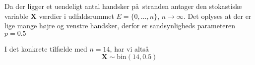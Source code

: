 {
Da der ligger et uendeligt antal handsker p\aa\ stranden antager den stokastiske variable $\mathbf{X}$ v\ae rdier i udfaldsrummet $E = \{0,\dots,n\}$, $n \rightarrow \infty$. Det oplyses at der er lige mange h\o jre og venstre handsker, derfor er sandsynligheds parameteren $p = 0.5$

I det konkrete tilf\ae lde med $n = 14$, har vi alts\aa\
\[
\mathbf{X} \sim \textrm{bin}(14,0.5)
\]


}
